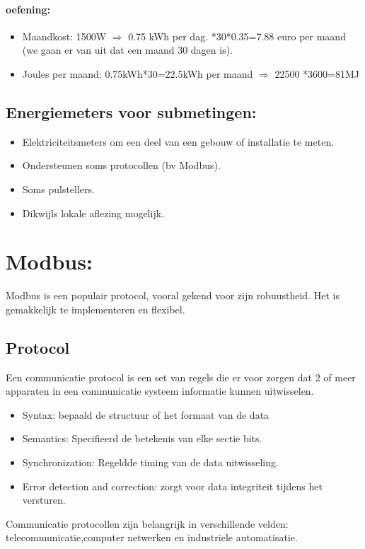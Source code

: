 \documentclass[12pt]{article}
\begin{document}
\paragraph{oefening:}
\begin{itemize}
    \item Maandkost: 1500W $\Rightarrow$ 0.75 kWh per dag. *30*0.35=7.88 euro per maand (we gaan er van uit dat een maand 30 dagen is).
    \item Joules per maand: 0.75kWh*30=22.5kWh per maand $\Rightarrow$ 22500 *3600=81MJ
\end{itemize}
\subsection{Energiemeters voor submetingen:}
\begin{itemize}
    \item Elektriciteitsmeters om een deel van een gebouw of installatie te meten.
    \item Ondersteunen soms protocollen (bv Modbus).
    \item Soms pulstellers.
    \item Dikwijls lokale aflezing mogelijk.
\end{itemize}
\section{Modbus:}
Modbus is een populair protocol, vooral gekend voor zijn robuustheid. Het is gemakkelijk te implementeren en flexibel.
\subsection{Protocol}
Een communicatie protocol is een set van regels die er voor zorgen dat 2 of meer apparaten in een communicatie systeem informatie kunnen uitwisselen.
\begin{itemize}
    \item Syntax: bepaald de structuur of het formaat van de data
    \item Semantics: Specifieerd de betekenis van elke sectie bits.
    \item Synchronization: Regeldde timing van de data uitwisseling.
    \item Error detection and correction: zorgt voor data integriteit tijdens het versturen.
\end{itemize}
Communicatie protocollen zijn belangrijk in verschillende velden: telecommunicatie,computer netwerken en industriele automatisatie.
\end{document}
